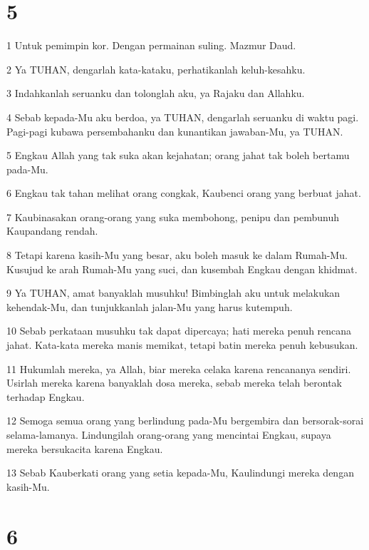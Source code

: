 \chapter{5}

\par 1 Untuk pemimpin kor. Dengan permainan suling. Mazmur Daud.
\par 2 Ya TUHAN, dengarlah kata-kataku, perhatikanlah keluh-kesahku.
\par 3 Indahkanlah seruanku dan tolonglah aku, ya Rajaku dan Allahku.
\par 4 Sebab kepada-Mu aku berdoa, ya TUHAN, dengarlah seruanku di waktu pagi. Pagi-pagi kubawa persembahanku dan kunantikan jawaban-Mu, ya TUHAN.
\par 5 Engkau Allah yang tak suka akan kejahatan; orang jahat tak boleh bertamu pada-Mu.
\par 6 Engkau tak tahan melihat orang congkak, Kaubenci orang yang berbuat jahat.
\par 7 Kaubinasakan orang-orang yang suka membohong, penipu dan pembunuh Kaupandang rendah.
\par 8 Tetapi karena kasih-Mu yang besar, aku boleh masuk ke dalam Rumah-Mu. Kusujud ke arah Rumah-Mu yang suci, dan kusembah Engkau dengan khidmat.
\par 9 Ya TUHAN, amat banyaklah musuhku! Bimbinglah aku untuk melakukan kehendak-Mu, dan tunjukkanlah jalan-Mu yang harus kutempuh.
\par 10 Sebab perkataan musuhku tak dapat dipercaya; hati mereka penuh rencana jahat. Kata-kata mereka manis memikat, tetapi batin mereka penuh kebusukan.
\par 11 Hukumlah mereka, ya Allah, biar mereka celaka karena rencananya sendiri. Usirlah mereka karena banyaklah dosa mereka, sebab mereka telah berontak terhadap Engkau.
\par 12 Semoga semua orang yang berlindung pada-Mu bergembira dan bersorak-sorai selama-lamanya. Lindungilah orang-orang yang mencintai Engkau, supaya mereka bersukacita karena Engkau.
\par 13 Sebab Kauberkati orang yang setia kepada-Mu, Kaulindungi mereka dengan kasih-Mu.

\chapter{6}


